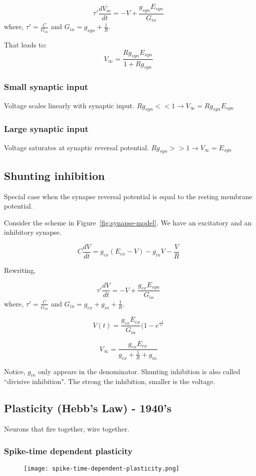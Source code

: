 \documentclass[main]{subfiles}
\begin{document}
\[ \tau\prime \frac{dV_m}{dt} = -V + \frac{g_{syn}E_{syn}}{G_{in}} \]
where, $\tau\prime = \frac{C}{G_{in}}$ and $G_{in} = g_{syn} + \frac{1}{R}$.

That leads to:
\[ V_\infty = \frac{R g_{syn} E_{syn}}{1 + R g_{syn}} \]

\subsubsection{Small synaptic input}
Voltage scales linearly with synaptic input.
$Rg_{syn} << 1 \rightarrow V_\infty = R g_{syn} E_{syn}$

\subsubsection{Large synaptic input}
Voltage saturates at synaptic reversal potential.
$Rg_{syn} >> 1 \rightarrow V_\infty = E_{syn}$

\subsection{Shunting inhibition}
Special case when the synapse reversal potential is equal to the resting membrane potential.

Consider the scheme in Figure~\ref{fig:synapse-model}. We have an excitatory and an inhibitory synapse.

\[ C \frac{dV}{dt} = g_{ex}(E_{ex} - V) - g_{in} V - \frac{V}{R} \]

Rewriting,

\[ \tau\prime \frac{dV}{dt} = -V + \frac{g_{ex}E_{syn}}{G_{in}} \]
where, $\tau\prime = \frac{C}{G_{in}}$ and $G_{in} = g_{ex} + g_{in} + \frac{1}{R}$.

\[ V(t) = \frac{g_{ex} E_{ex}}{G_{in}} (1 - e^{\frac{-t}{\tau\prime}} \]

\[ V_\infty = \frac{g_{ex} E_{ex}}{g_{ex} + \frac{1}{R} + g_{in}} \]

Notice, $g_{in}$ only appears in the denominator. 
Shunting inhibition is also called ``divisive inhibition".
The strong the inhibition, smaller is the voltage.

\subsection{Plasticity (Hebb's Law) - 1940's}
Neurons that fire together, wire together.

\subsubsection{Spike-time dependent plasticity}
\begin{figure}[H]
	\centering
 	\texttt{[image: spike-time-dependent-plasticity.png]}
\end{figure}
\end{document}

